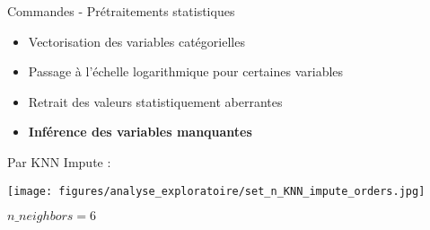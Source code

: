 \documentclass[10pt]{beamer}
\begin{document}
\begin{frame}{Commandes - Prétraitements statistiques}
    \begin{minipage}{0.52\linewidth}
        \begin{itemize}
            \item Vectorisation des variables catégorielles 
            \item Passage à l'échelle logarithmique pour certaines variables
            \item Retrait des valeurs statistiquement aberrantes
            \item \textbf{Inférence des variables manquantes}
        \end{itemize}
    \end{minipage}
    \begin{minipage}{0.45\linewidth}
        Par KNN Impute : 
        \begin{center}
            \texttt{[image: figures/analyse\_exploratoire/set\_n\_KNN\_impute\_orders.jpg]}
        \end{center}
        $n\_neighbors = 6$
    \end{minipage}
\end{frame}
\end{document}
